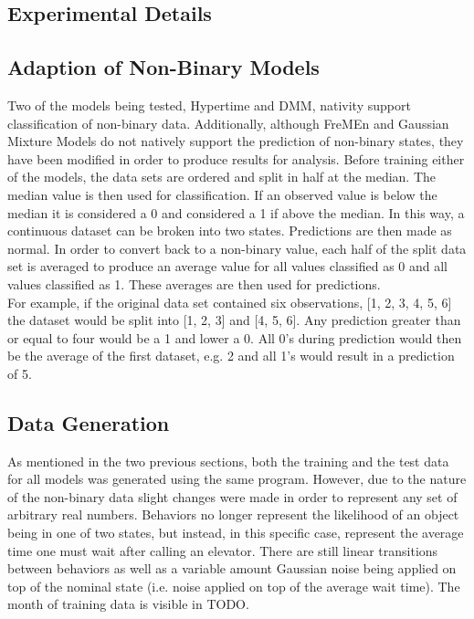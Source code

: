   \subsection{ Experimental Details }

  \subsection{ Adaption of Non-Binary Models }

  Two of the models being tested, Hypertime and DMM, nativity support
  classification of non-binary data. Additionally, although FreMEn and Gaussian Mixture Models
  do not natively support the prediction of non-binary states, they have been
  modified in order to produce results for analysis. Before training either of
  the models, the data sets are ordered and split in half at the median. The
  median value is then used for classification. If an observed value is below
  the median it is considered a 0 and considered a 1 if above the median. In this way, a continuous
  dataset can be broken into two states. Predictions are then made as normal.
  In order to convert back to a non-binary value, each half of the split data
  set is averaged to produce an average value for all values classified as 0 and
  all values classified as 1. These averages are then used for predictions. \\

  For example, if the original data set contained six observations,
  [1, 2, 3, 4, 5, 6] the dataset would be split into [1, 2, 3] and [4, 5, 6].
  Any prediction greater than or equal to four would be a 1 and lower a 0. All 0's during
  prediction would then be the average of the first dataset, e.g. 2 and all
  1's would result in a prediction of 5. \\

  \subsection{ Data Generation }

  As mentioned in the two previous sections, both the training and the test
  data for all models was generated using the same program. However,
  due to the nature of the non-binary data slight changes were made in order
  to represent any set of arbitrary real numbers. Behaviors no longer represent
  the likelihood of an object being in one of two states, but instead, in this
  specific case, represent the average time one must wait after calling an
  elevator. There are still linear transitions between behaviors as well as
  a variable amount Gaussian noise being applied on top of the nominal state
  (i.e. noise applied on top of the average wait time). The month of training
  data is visible in TODO. \\


